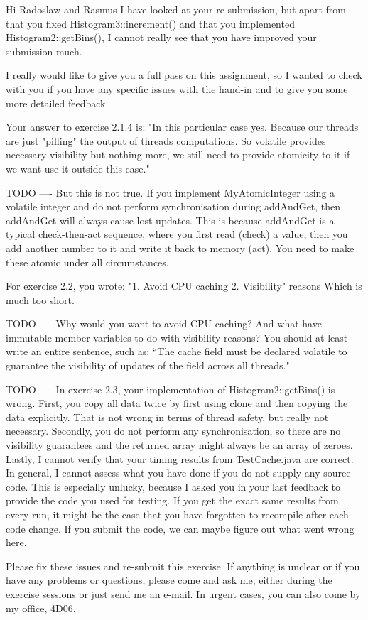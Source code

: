 Hi Radoslaw and Rasmus I have looked at your re-submission, but apart from that you fixed Histogram3::increment() and that you implemented Histogram2::getBins(), I cannot really see that you have improved your submission much. 

I really would like to give you a full pass on this assignment, so I wanted to check with you if you have any specific issues with the hand-in and to give you some more detailed feedback. 

Your answer to exercise 2.1.4 is: "In this particular case yes. Because our threads are just "pilling" the output of threads computations. So volatile provides necessary visibility but nothing more, we still need to provide atomicity to it if we want use it outside this case." 

TODO ----
But this is not true. If you implement MyAtomicInteger using a volatile integer and do not perform synchronisation during addAndGet, then addAndGet will always cause lost updates. This is because addAndGet is a typical check-then-act sequence, where you first read (check) a value, then you add another number to it and write it back to memory (act). You need to make these atomic under all circumstances. 

For exercise 2.2, you wrote: 
"1. Avoid CPU caching
2. Visibility" reasons Which is much too short. 

TODO ----
Why would you want to avoid CPU caching? And what have immutable member variables to do with visibility reasons? You should at least write an entire sentence, such as: “The cache field must be declared volatile to guarantee the visibility of updates of the field across all threads."

TODO ----
In exercise 2.3, your implementation of Histogram2::getBins() is wrong. First, you copy all data twice by first using clone and then copying the data explicitly. That is not wrong in terms of thread safety, but really not necessary. 
Secondly, you do not perform any synchronisation, so there are no visibility guarantees and the returned array might always be an array of zeroes. 
Lastly, I cannot verify that your timing results from TestCache.java are correct. In general, I cannot assess what you have done if you do not supply any source code. This is especially unlucky, because I asked you in your last feedback to provide the code you used for testing. If you get the exact same results from every run, it might be the case that you have forgotten to recompile after each code change. If you submit the code, we can maybe figure out what went wrong here. 

Please fix these issues and re-submit this exercise. If anything is unclear or if you have any problems or questions, please come and ask me, either during the exercise sessions or just send me an e-mail. In urgent cases, you can also come by my office, 4D06.